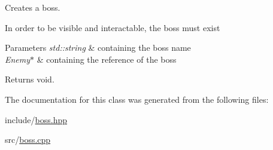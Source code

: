 Creates a boss. 

In order to be visible and interactable, the boss must exist


\begin{DoxyParams}{Parameters}
{\em std\+::string} & containing the boss name \\
\hline
{\em Enemy$\ast$} & containing the reference of the boss \\
\hline
\end{DoxyParams}
\begin{DoxyReturn}{Returns}
void. 
\end{DoxyReturn}


The documentation for this class was generated from the following files\+:\begin{DoxyCompactItemize}
\item 
include/\hyperlink{boss_8hpp}{boss.\+hpp}\item 
src/\hyperlink{boss_8cpp}{boss.\+cpp}\end{DoxyCompactItemize}
